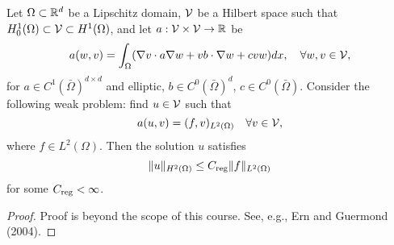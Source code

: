 \begin{lemma}
  \label{lemma:th_elliptic_reg}
  Let $\Omega \subset \mathbb{R}^d$ be a Lipschitz domain, $\mathcal{V}$ be a Hilbert space such that $H_0^1(\Omega) \subset \mathcal{V} \subset H^1(\Omega)$, and let $a: \mathcal{V} \times \mathcal{V} \to \mathbb{R}$ be
  \begin{equation*}
    a(w,v) = \int_\Omega (\nabla v \cdot a \nabla w + v b \cdot \nabla w + c v w) dx,  \quad \forall w, v \in \mathcal{V},
  \end{equation*}
  for $a \in C^{1}(\bar \Omega)^{d \times d}$ and elliptic, $b \in C^0(\bar \Omega)^d$, $c \in C^0(\bar \Omega)$.  Consider the following weak problem: find $u \in \mathcal{V}$ such that
  \begin{equation*}
    a(u,v) = (f,v)_{L^2(\Omega)} \quad \forall v \in \mathcal{V},
  \end{equation*}
  where $f \in L^2(\Omega)$. Then the solution $u$ satisfies
  \begin{equation*}
    \| u \|_{H^2(\Omega)} \leq C_{\rm reg} \| f \|_{L^2(\Omega)}
  \end{equation*}
  for some $C_{\rm reg} < \infty$.
  \begin{proof}
    Proof is beyond the scope of this course.  See, e.g., Ern and Guermond (2004). %
  \end{proof}
\end{lemma}
